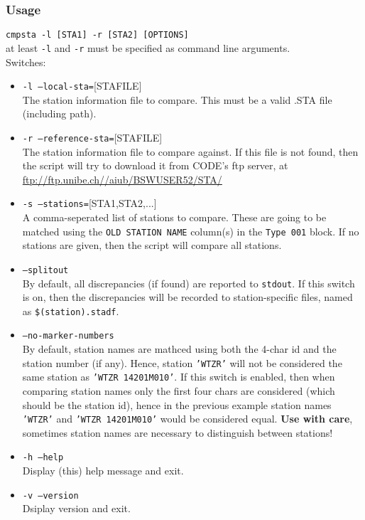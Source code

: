 \subsubsection{Usage}
\texttt{cmpsta -l [STA1] -r [STA2] [OPTIONS]}\\
at least \texttt{-l} and \texttt{-r}
must be specified as command line arguments.\\

Switches:
\begin{itemize}
\item \texttt{-l --local-sta=}[STAFILE]\\
The station information file to compare. This must be a valid .STA file (including path).
\item \texttt{-r --reference-sta=}[STAFILE]\\
The station information file to compare against. If this file is not found, then the 
script will try to download it from CODE's ftp server, at \url{ftp://ftp.unibe.ch//aiub/BSWUSER52/STA/}
\item \texttt{-s --stations=}[STA1,STA2,...]\\
A comma-seperated list of stations to compare. These are going to be matched using the 
\texttt{OLD STATION NAME} column(s) in the \texttt{Type 001} block. If no stations are
given, then the script will compare all stations.
\item \texttt{--splitout}\\
By default, all discrepancies (if found) are reported to \texttt{stdout}. If this switch is on,
then the discrepancies will be recorded to station-specific files, named as 
\texttt{\$(station).stadf}\footnotemark[1].
\item \texttt{--no-marker-numbers}\\
By default, station names are mathced using both the 4-char id and the station number (if any).
Hence, station \texttt{'WTZR'} will not be considered the same station as \texttt{'WTZR 14201M010'}.
If this switch is enabled, then when comparing station names only the first four 
chars are considered (which should be the station id), hence in the previous example
station names \texttt{'WTZR'} and \texttt{'WTZR 14201M010'} would be considered equal.
\textbf{Use with care}, sometimes station names are necessary to distinguish between stations!
\item \texttt{-h --help}\\
Display (this) help message and exit.
\item \texttt{-v --version}\\
Dsiplay version and exit.
\end{itemize}


